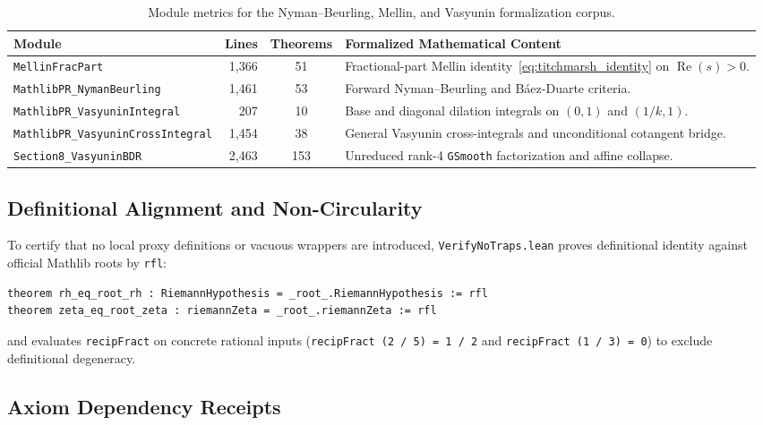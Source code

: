 \documentclass[11pt,a4paper]{article}
\theoremstyle{definition}
\begin{document}
\begin{table}[ht]
\centering
\footnotesize
\begin{tabular}{@{}lrc>{\raggedright\arraybackslash}p{6.6cm}@{}}
\toprule
\textbf{Module} & \textbf{Lines} & \textbf{Theorems} & \textbf{Formalized Mathematical Content} \\
\midrule
\texttt{MellinFracPart} & 1,366 & 51 & Fractional-part Mellin identity~\eqref{eq:titchmarsh_identity} on $\operatorname{Re}(s) > 0$. \\
\texttt{MathlibPR\_NymanBeurling} & 1,461 & 53 & Forward Nyman--Beurling and B\'aez-Duarte criteria. \\
\texttt{MathlibPR\_VasyuninIntegral} & 207 & 10 & Base and diagonal dilation integrals on $(0, 1)$ and $(1/k, 1)$. \\
\texttt{MathlibPR\_VasyuninCrossIntegral} & 1,454 & 38 & General Vasyunin cross-integrals and unconditional cotangent bridge. \\
\texttt{Section8\_VasyuninBDR} & 2,463 & 153 & Unreduced rank-4 \texttt{GSmooth} factorization and affine collapse. \\
\bottomrule
\end{tabular}
\caption{Module metrics for the Nyman--Beurling, Mellin, and Vasyunin formalization corpus.}
\label{tab:module_metrics}
\end{table}

\subsection{Definitional Alignment and Non-Circularity}

To certify that no local proxy definitions or vacuous wrappers are introduced, \texttt{VerifyNoTraps.lean} proves definitional identity against official Mathlib roots by \texttt{rfl}:
\begin{lstlisting}
theorem rh_eq_root_rh : RiemannHypothesis = _root_.RiemannHypothesis := rfl
theorem zeta_eq_root_zeta : riemannZeta = _root_.riemannZeta := rfl
\end{lstlisting}
and evaluates \texttt{recipFract} on concrete rational inputs (\texttt{recipFract (2 / 5) = 1 / 2} and \texttt{recipFract (1 / 3) = 0}) to exclude definitional degeneracy.

\subsection{Axiom Dependency Receipts}
\end{document}
